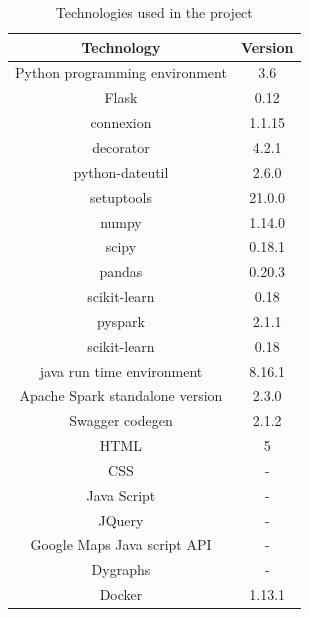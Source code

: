 \begin{table}[htb]
\centering
\caption{Technologies used in the project}\label{tab:technology}
\begin{tabular}{*{2}{c}}
\toprule
Technology                      & Version \\
\midrule
Python programming environment  & 3.6     \\
Flask                           & 0.12    \\
connexion                       & 1.1.15  \\
decorator                       & 4.2.1   \\
python-dateutil                 & 2.6.0   \\
setuptools                      & 21.0.0  \\
numpy                           & 1.14.0  \\
scipy                           & 0.18.1  \\
pandas                          & 0.20.3  \\
scikit-learn                    & 0.18    \\
pyspark                         & 2.1.1   \\
scikit-learn                    & 0.18    \\
java run time environment       & 8.16.1  \\
Apache Spark standalone version & 2.3.0   \\
Swagger codegen                 & 2.1.2   \\
HTML                            & 5       \\
CSS                             & -       \\
Java Script                     & -       \\
JQuery                          & -       \\
Google Maps Java script API     & -       \\
Dygraphs                        & -       \\
Docker                          & 1.13.1  \\
\bottomrule
\end{tabular}
\end{table}

